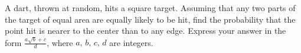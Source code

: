 A dart, thrown at random, hits a square target. Assuming that any two
parts of the target of equal area are equally likely to be hit, find
the probability that the point hit is nearer to the center than to any
edge. Express your answer in the form $\displaystyle{\frac{a\sqrt{b} + c}{d}}$,
where $a,\,b,\,c,\,d$ are integers.
